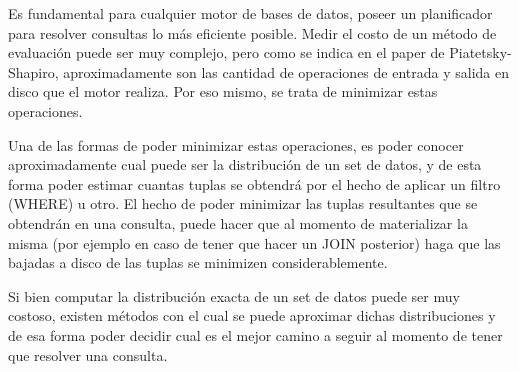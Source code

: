 \quad Es fundamental para cualquier motor de bases de datos, poseer un planificador para resolver consultas lo m\'as eficiente posible. Medir el costo de un m\'etodo de evaluaci\'on puede ser muy complejo, pero como se indica en el paper de Piatetsky-Shapiro, aproximadamente son las cantidad de operaciones de entrada y salida en disco que el motor realiza. Por eso mismo, se trata de minimizar estas operaciones.


\quad Una de las formas de poder minimizar estas operaciones, es poder conocer aproximadamente cual puede ser la distribuci\'on de un set de datos, y de esta forma poder estimar cuantas tuplas se obtendr\'a por el hecho de aplicar un filtro (WHERE) u otro. El hecho de poder minimizar las tuplas resultantes que se obtendr\'an en una consulta, puede hacer que al momento de materializar la misma (por ejemplo en caso de tener que hacer un JOIN posterior) haga que las bajadas a disco de las tuplas se minimizen considerablemente.


\quad Si bien computar la distribuci\'on exacta de un set de datos puede ser muy costoso, existen m\'etodos con el cual se puede aproximar dichas distribuciones y de esa forma poder decidir cual es el mejor camino a seguir al momento de tener que resolver una consulta.


